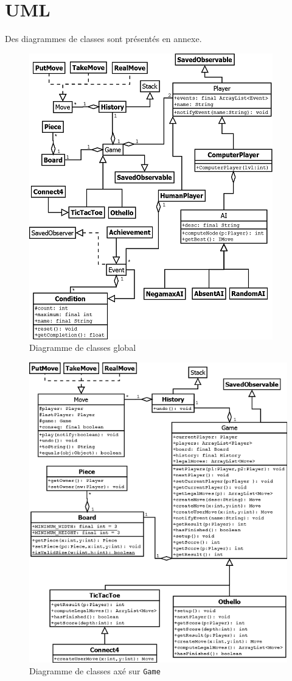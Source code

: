 \section{UML}
Des diagrammes de classes sont présentés en annexe.

\begin{figure}[ht]
\centering
\includegraphics{../uml_global.png}
\caption{Diagramme de classes global}
\label{fig:umlGlobal}
\end{figure}
\begin{figure}[ht]
\centering
\includegraphics{../uml_Game.png}
\caption{Diagramme de classes axé sur \texttt{Game}}
\label{fig:umlGame}
\end{figure}